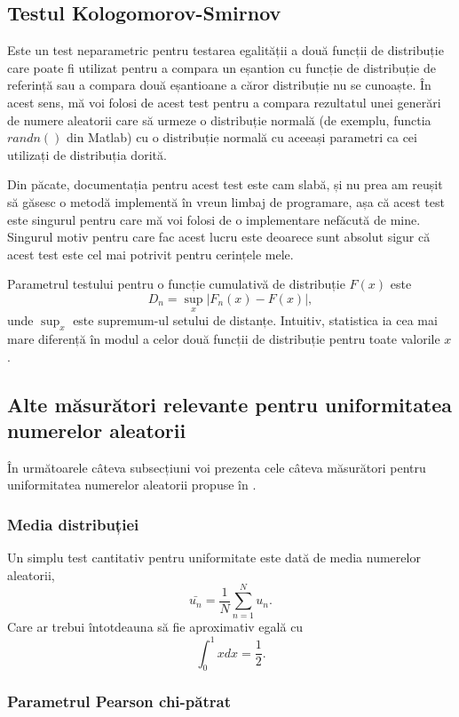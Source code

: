 \subsection{Testul Kologomorov-Smirnov}

Este un test neparametric pentru testarea egalității a două funcții de distribuție care poate fi utilizat pentru a compara un eșantion cu funcție de distribuție de referință sau a compara două eșantioane a căror distribuție nu se cunoaște. În acest sens, mă voi folosi de acest test pentru a compara rezultatul unei generări de numere aleatorii care să urmeze o distribuție normală (de exemplu, functia $randn()$ din Matlab) cu o distribuție normală cu aceeași parametri ca cei utilizați de distribuția dorită.

Din păcate, documentația pentru acest test este cam slabă, și nu prea am reușit să găsesc o metodă implementă în vreun limbaj de programare, așa că acest test este singurul pentru care mă voi folosi de o implementare nefăcută de mine. Singurul motiv pentru care fac acest lucru este deoarece sunt absolut sigur că acest test este cel mai potrivit pentru cerințele mele.

Parametrul testului pentru o funcție cumulativă de distribuție $F(x)$ este
\[
D_n = \sup_x |F_n(x) - F(x)|,
\]
unde $\sup_x$ este supremum-ul setului de distanțe. Intuitiv, statistica ia cea mai mare diferență în modul a celor două funcții de distribuție pentru toate valorile $x$.

\subsection{Alte măsurători relevante pentru uniformitatea numerelor aleatorii}
În următoarele câteva subsecțiuni voi prezenta cele câteva măsurători pentru uniformitatea numerelor aleatorii propuse în \cite{art:PetrilaMantaUnguranu:IEEESystheory:2014}.
\subsubsection{Media distribuției}

Un simplu test cantitativ pentru uniformitate este dată de media numerelor aleatorii,
\[
\bar{u_n} = \frac{1}{N}\sum^N_{n=1}u_n.
\]
Care ar trebui întotdeauna să fie aproximativ egală cu
\[
\int_0^1xdx = \frac{1}{2}.
\]

\subsubsection{Parametrul Pearson chi-pătrat}


